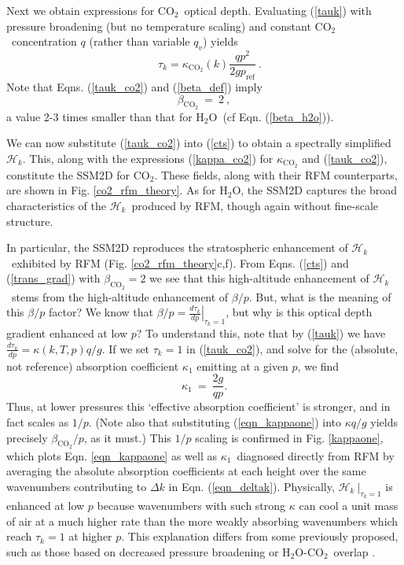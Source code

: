 \documentclass{ametsoc}
\newcommand{\beqn}{\begin{equation}}
\newcommand{\eeqn}{\end{equation}}
\newcommand{\n}{\nonumber}
\newcommand{\eqnref}[1]{(\ref{#1})}
\newcommand{\der}[2]{\ensuremath{\frac{d #1}{d #2}}}
\newcommand{\qv}{\ensuremath{q_v}}
\newcommand{\cotwo}{\ensuremath{\mathrm{CO_2}}}
\newcommand{\htwo}{\ensuremath{\mathrm{H_2O}}}
\newcommand{\ch}{\ensuremath{\mathcal{H}}}
\newcommand{\chk}{\ensuremath{\ch_k}}
\newcommand{\tauk}{\ensuremath{\tau_k}}
\newcommand{\kappaone}{\ensuremath{\kappa_1}}
\newcommand{\pref}{\ensuremath{p_{\mathrm{ref}}}}
\begin{document}
Next we obtain expressions for \cotwo\ optical depth. Evaluating  \eqnref{tauk} with pressure broadening (but no temperature scaling) and constant \cotwo\ concentration $q$ (rather than variable \qv) yields
\beqn
	\quad \tauk  = \kappa_{\cotwo}(k)\frac{qp^2}{2g\pref}   \ .
	\label{tauk_co2}
\eeqn
 Note that Eqns. \eqnref{tauk_co2} and \eqnref{beta_def} imply 
 \beqn
 	\beta_{\cotwo} \ = \ 2 \ ,
	\n
\eeqn
a value 2-3 times smaller than that for \htwo\ (cf Eqn. \eqnref{beta_h2o}).

We can now substitute \eqnref{tauk_co2} into \eqnref{cts} to obtain a spectrally simplified \chk. This, along with the expressions \eqnref{kappa_co2} for $\kappa_{\cotwo}$ and \eqnref{tauk_co2}, constitute the SSM2D for \cotwo. These fields, along with their RFM counterparts, are shown in Fig. \ref{co2_rfm_theory}. As for \htwo, the SSM2D captures the broad characteristics of the \chk\ produced by RFM, though again without fine-scale structure. 

In particular, the SSM2D reproduces the stratospheric enhancement of \chk\ exhibited by RFM (Fig. \ref{co2_rfm_theory}c,f). From Eqns. \eqnref{cts} and \eqnref{trans_grad} with $\beta_{\cotwo}=2$  we see that this high-altitude enhancement of \chk\  stems from the high-altitude enhancement of $\beta/p$.  But, what is the meaning of this $\beta/p$ factor? We know that $\beta/p = \left. \der{\tauk}{p}\right|_{\tauk=1}$, but why is this optical depth gradient enhanced at low $p$? To understand this, note that by \eqnref{tauk} we have $\der{\tauk}{p} = \kappa(k,T,p)q/g$. If we set  $\tauk=1$ in  \eqnref{tauk_co2}, and solve for the (absolute, not reference) absorption coefficient $\kappa_1$ emitting at a given $p$, we find 
\beqn
	\kappa_1 \ = \ \frac{2g}{qp}.
	\label{eqn_kappaone}
\eeqn
 Thus, at lower pressures this `effective absorption coefficient' is stronger, and in fact  scales as $1/p$. (Note also that substituting \eqnref{eqn_kappaone} into $\kappa q/g$ yields precisely $\beta_{\cotwo}/p$, as it must.) This $1/p$ scaling is confirmed in Fig. \ref{kappaone}, which plots Eqn. \eqref{eqn_kappaone} as well as \kappaone\ diagnosed directly from RFM by averaging the absolute absorption coefficients at each height over the same wavenumbers  contributing to $\Delta k$ in Eqn. \eqnref{eqn_deltak}. Physically, $\left.\chk\ \right|_{\tauk=1}$ is enhanced at low $p$  because wavenumbers with such strong $\kappa$ can cool a unit mass of air at a much higher rate than the more weakly absorbing wavenumbers which reach $\tauk=1$ at higher $p$.  This explanation differs from some previously proposed, such as those based on decreased pressure broadening \citep[][pg. 317]{petty2006} or \htwo-\cotwo\ overlap \citep[][]{zhu1992}.
\end{document}
